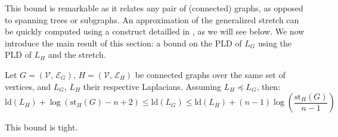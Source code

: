 This bound is remarkable as it relates any pair of (connected) graphs,
as opposed to spanning trees or subgraphs. An approximation of the
generalized stretch can be quickly computed using a construct detailled
in \cite{Spielman2009}, as we will see below. We now introduce the
main result of this section: a bound on the PLD of $L_{G}$ using
the PLD of $L_{H}$ and the stretch.

\begin{theorem}\label{thm:stretch-pld-bounds}Let $G=\left(\mathcal{V},\,\mathcal{E}_{G}\right),\, H=\left(\mathcal{V},\,\mathcal{E}_{H}\right)$
be connected graphs over the same set of vertices, and $L_{G}$, $L_{H}$
their respective Laplacians. Assuming $L_{H}\preceq L_{G}$, then:
\begin{equation}
\text{ld}\left(L_{H}\right)+\log\left(\text{st}_{H}\left(G\right)-n+2\right)\leq\text{ld}\left(L_{G}\right)\leq\text{ld}\left(L_{H}\right)+\left(n-1\right)\log\left(\frac{\text{st}_{H}\left(G\right)}{n-1}\right)\label{eq:encadrement-1}
\end{equation}


This bound is tight.

\end{theorem}

